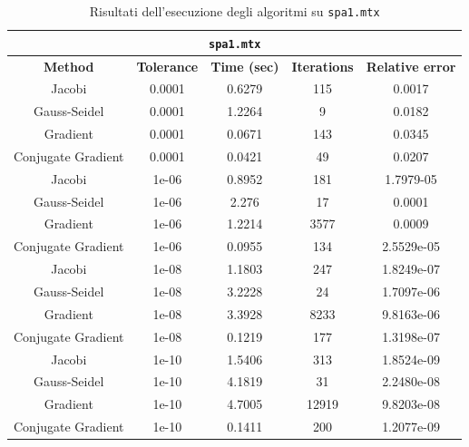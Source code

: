 \documentclass[12pt]{article}
\begin{document}
\begin{table}[!ht]
    \centering
    \begin{tabular}{ccccc}
    \toprule
    \multicolumn{5}{c}{\texttt{spa1.mtx}}\\
    \midrule
        \textbf{Method} & \textbf{Tolerance} & \textbf{Time (sec)} & \textbf{Iterations} & \textbf{Relative error} \\ \midrule
        Jacobi & 0.0001 & 0.6279 & 115 & 0.0017 \\ 
        Gauss-Seidel & 0.0001 & 1.2264 & 9 & 0.0182 \\ 
        Gradient & 0.0001 & 0.0671 & 143 & 0.0345 \\ 
        Conjugate Gradient & 0.0001 & 0.0421 & 49 & 0.0207 \\ \midrule
        Jacobi & 1e-06 & 0.8952 & 181 & 1.7979-05 \\ 
        Gauss-Seidel & 1e-06 & 2.276 & 17 & 0.0001 \\ 
        Gradient & 1e-06 & 1.2214 & 3577 & 0.0009 \\ 
        Conjugate Gradient & 1e-06 & 0.0955 & 134 & 2.5529e-05 \\ \midrule
        Jacobi & 1e-08 & 1.1803 & 247 & 1.8249e-07 \\ 
        Gauss-Seidel & 1e-08 & 3.2228 & 24 & 1.7097e-06 \\ 
        Gradient & 1e-08 & 3.3928 & 8233 & 9.8163e-06 \\ 
        Conjugate Gradient & 1e-08 & 0.1219 & 177 & 1.3198e-07 \\ \midrule
        Jacobi & 1e-10 & 1.5406 & 313 & 1.8524e-09 \\ 
        Gauss-Seidel & 1e-10 & 4.1819 & 31 & 2.2480e-08 \\ 
        Gradient & 1e-10 & 4.7005 & 12919 & 9.8203e-08 \\ 
        Conjugate Gradient & 1e-10 & 0.1411 & 200 & 1.2077e-09 \\  \bottomrule
    \end{tabular}
    \caption{Risultati dell'esecuzione degli algoritmi su \texttt{spa1.mtx}}
    \label{table:spa1-stats}
\end{table}
\end{document}

